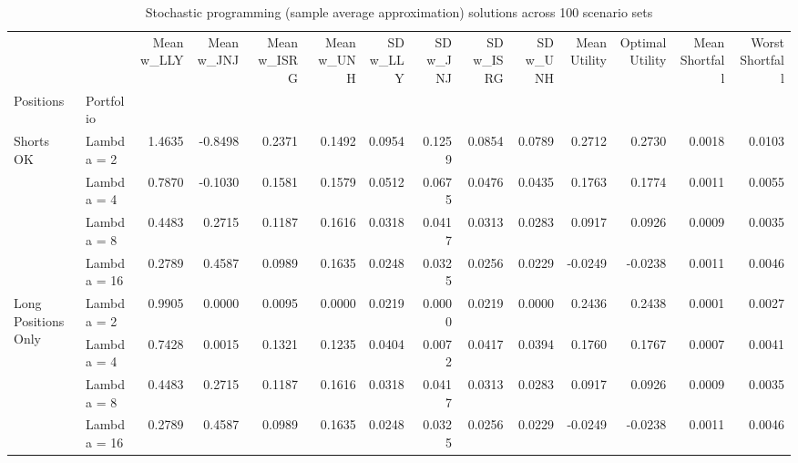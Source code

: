 \begin{table}
\caption{Stochastic programming (sample average approximation) solutions across 100 scenario sets}
\label{tab:stochastic-solutions}
\begin{tabular}{llrrrrrrrrrrrr}
\toprule
 &  & Mean w\_LLY & Mean w\_JNJ & Mean w\_ISRG & Mean w\_UNH & SD w\_LLY & SD w\_JNJ & SD w\_ISRG & SD w\_UNH & Mean Utility & Optimal Utility & Mean Shortfall & Worst Shortfall \\
Positions & Portfolio &  &  &  &  &  &  &  &  &  &  &  &  \\
\midrule
\multirow[t]{4}{*}{Shorts OK} & Lambda = 2 & 1.4635 & -0.8498 & 0.2371 & 0.1492 & 0.0954 & 0.1259 & 0.0854 & 0.0789 & 0.2712 & 0.2730 & 0.0018 & 0.0103 \\
 & Lambda = 4 & 0.7870 & -0.1030 & 0.1581 & 0.1579 & 0.0512 & 0.0675 & 0.0476 & 0.0435 & 0.1763 & 0.1774 & 0.0011 & 0.0055 \\
 & Lambda = 8 & 0.4483 & 0.2715 & 0.1187 & 0.1616 & 0.0318 & 0.0417 & 0.0313 & 0.0283 & 0.0917 & 0.0926 & 0.0009 & 0.0035 \\
 & Lambda = 16 & 0.2789 & 0.4587 & 0.0989 & 0.1635 & 0.0248 & 0.0325 & 0.0256 & 0.0229 & -0.0249 & -0.0238 & 0.0011 & 0.0046 \\
\cline{1-14}
\multirow[t]{4}{*}{Long Positions Only} & Lambda = 2 & 0.9905 & 0.0000 & 0.0095 & 0.0000 & 0.0219 & 0.0000 & 0.0219 & 0.0000 & 0.2436 & 0.2438 & 0.0001 & 0.0027 \\
 & Lambda = 4 & 0.7428 & 0.0015 & 0.1321 & 0.1235 & 0.0404 & 0.0072 & 0.0417 & 0.0394 & 0.1760 & 0.1767 & 0.0007 & 0.0041 \\
 & Lambda = 8 & 0.4483 & 0.2715 & 0.1187 & 0.1616 & 0.0318 & 0.0417 & 0.0313 & 0.0283 & 0.0917 & 0.0926 & 0.0009 & 0.0035 \\
 & Lambda = 16 & 0.2789 & 0.4587 & 0.0989 & 0.1635 & 0.0248 & 0.0325 & 0.0256 & 0.0229 & -0.0249 & -0.0238 & 0.0011 & 0.0046 \\
\cline{1-14}
\bottomrule
\end{tabular}
\end{table}
